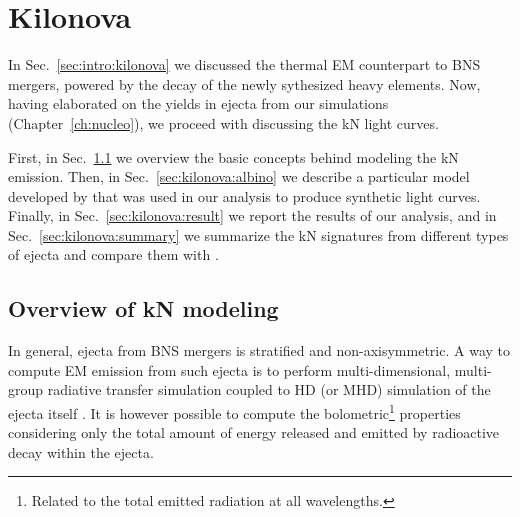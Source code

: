 
\chapter{Kilonova} \label{ch:kilonova} 

In Sec.~\ref{sec:intro:kilonova} we discussed the thermal \ac{EM} 
counterpart to \ac{BNS} mergers, powered by the decay of the newly 
sythesized heavy elements. Now, having elaborated on the 
\rproc{} yields in ejecta from our simulations (Chapter~\ref{ch:nucleo}), 
we proceed with discussing the \ac{kN} light curves. 

First, in Sec.~\ref{sec:kilonova:modeling} we overview the basic 
concepts behind modeling the \ac{kN} emission. 
%
Then, in Sec.~\ref{sec:kilonova:albino} we describe a particular model  
developed by \cite{Perego:2017wtu} that was used in our analysis 
to produce synthetic light curves. 
%
Finally, in Sec.~\ref{sec:kilonova:result} 
we report the results of our analysis, and in 
Sec.~\ref{sec:kilonova:summary} we summarize the \ac{kN} signatures 
from different types of ejecta and compare them with \AT{}.





\section{Overview of \ac{kN} modeling} \label{sec:kilonova:modeling}

In general, ejecta from \ac{BNS} mergers is stratified and non-axisymmetric. 
A way to compute \ac{EM} emission from such ejecta is to perform 
multi-dimensional, 
multi-group radiative transfer simulation coupled to \ac{HD} (or \ac{MHD}) 
simulation of the ejecta itself \citep[\eg][]{Bulla:2019muo}.
%
It is however possible to compute the bolometric\footnote{
    Related to the total emitted radiation at all wavelengths. 
} properties considering only the total amount 
of energy released and emitted by radioactive decay within the ejecta. 

